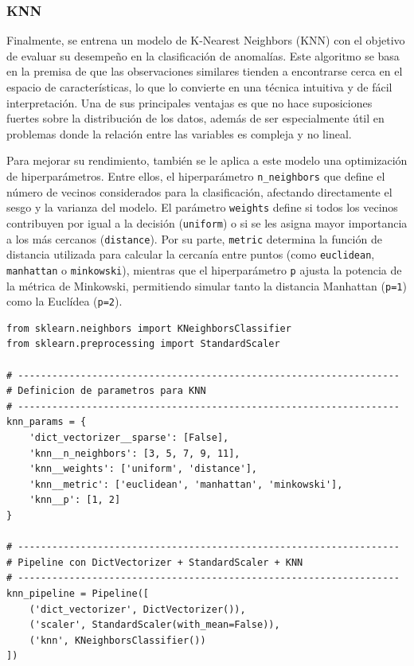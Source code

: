 \documentclass[11pt,a4paper,spanish]{book}
\numberwithin{equation}{chapter}
\numberwithin{figure}{chapter}
\begin{document}
\subsubsection{KNN}


Finalmente, se entrena un modelo de K-Nearest Neighbors (KNN) con el objetivo de 
evaluar su desempeño en la clasificación de anomalías. 
Este algoritmo se basa en la premisa de que las observaciones similares tienden a 
encontrarse cerca en el espacio de características, lo que lo convierte en una técnica 
intuitiva y de fácil interpretación. Una de sus principales ventajas es que no hace 
suposiciones fuertes sobre la distribución de los datos, además de ser especialmente 
útil en problemas donde la relación entre las variables es compleja y no lineal.


Para mejorar su rendimiento, también se le aplica a este modelo una optimización de 
hiperparámetros. Entre ellos, el hiperparámetro \lstinline|n_neighbors| que define el 
número de vecinos considerados para la clasificación, afectando directamente el sesgo y 
la varianza del modelo. El parámetro \lstinline|weights| define si todos los vecinos 
contribuyen por igual a la decisión (\lstinline|uniform|) o si se les asigna mayor 
importancia a los más cercanos (\lstinline|distance|). Por su parte, \lstinline|metric| 
determina la función de distancia utilizada para calcular la cercanía entre puntos 
(como \lstinline|euclidean|, \lstinline|manhattan| o \lstinline|minkowski|), mientras 
que el hiperparámetro \lstinline|p| ajusta la potencia de la métrica de Minkowski, 
permitiendo simular tanto la distancia Manhattan (\lstinline|p=1|) como la 
Euclídea (\lstinline|p=2|). 


\vspace{5mm}
\begin{lstlisting}
from sklearn.neighbors import KNeighborsClassifier
from sklearn.preprocessing import StandardScaler

# -------------------------------------------------------------------
# Definicion de parametros para KNN
# -------------------------------------------------------------------
knn_params = {
    'dict_vectorizer__sparse': [False],
    'knn__n_neighbors': [3, 5, 7, 9, 11],     
    'knn__weights': ['uniform', 'distance'],  
    'knn__metric': ['euclidean', 'manhattan', 'minkowski'],  
    'knn__p': [1, 2]  
}

# -------------------------------------------------------------------
# Pipeline con DictVectorizer + StandardScaler + KNN
# -------------------------------------------------------------------
knn_pipeline = Pipeline([
    ('dict_vectorizer', DictVectorizer()),
    ('scaler', StandardScaler(with_mean=False)),  
    ('knn', KNeighborsClassifier())
])
\end{lstlisting}
\end{document}
